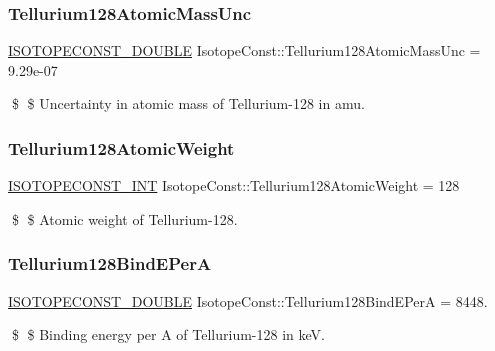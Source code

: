 \subsubsection{\texorpdfstring{Tellurium128\+Atomic\+Mass\+Unc}{Tellurium128AtomicMassUnc}}
{\footnotesize\ttfamily \mbox{\hyperlink{group___isotope_const-_macros_ga8f45a7272ce02c0b4c65c44636ed719a}{I\+S\+O\+T\+O\+P\+E\+C\+O\+N\+S\+T\+\_\+\+D\+O\+U\+B\+LE}} Isotope\+Const\+::\+Tellurium128\+Atomic\+Mass\+Unc = 9.\+29e-\/07}

\$ \$ Uncertainty in atomic mass of Tellurium-\/128 in amu. \mbox{\label{group___isotope_const-_tellurium-_te128_ga516a305cc7b657f3305520d23908d7e6}} 
\subsubsection{\texorpdfstring{Tellurium128\+Atomic\+Weight}{Tellurium128AtomicWeight}}
{\footnotesize\ttfamily \mbox{\hyperlink{group___isotope_const-_macros_ga5f18360b3e99483a35c32d789e62621c}{I\+S\+O\+T\+O\+P\+E\+C\+O\+N\+S\+T\+\_\+\+I\+NT}} Isotope\+Const\+::\+Tellurium128\+Atomic\+Weight = 128}

\$ \$ Atomic weight of Tellurium-\/128. \mbox{\label{group___isotope_const-_tellurium-_te128_ga8370ddfb513b05c0d2fd9320a1614529}} 
\subsubsection{\texorpdfstring{Tellurium128\+Bind\+E\+PerA}{Tellurium128BindEPerA}}
{\footnotesize\ttfamily \mbox{\hyperlink{group___isotope_const-_macros_ga8f45a7272ce02c0b4c65c44636ed719a}{I\+S\+O\+T\+O\+P\+E\+C\+O\+N\+S\+T\+\_\+\+D\+O\+U\+B\+LE}} Isotope\+Const\+::\+Tellurium128\+Bind\+E\+PerA = 8448.}

\$ \$ Binding energy per A of Tellurium-\/128 in keV. \mbox{\label{group___isotope_const-_tellurium-_te128_gab43fba3419dfeff412107006d68136fc}} 

